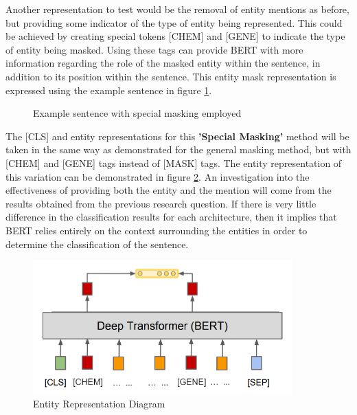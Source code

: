 \documentclass{l4proj}
\begin{document}
Another representation to test would be the removal of entity mentions as before, but providing some indicator of the type of entity being represented. This could be achieved by creating special tokens [CHEM] and [GENE] to indicate the type of entity being masked. Using these tags can provide BERT with more information regarding the role of the masked entity within the sentence, in addition to its position within the sentence. This entity mask representation is expressed using the example sentence in figure \ref{fig:Special}.

\begin{figure}[h]
    \centering
  \caption{Example sentence with special masking employed}
  \label{fig:Special}
\end{figure}

\newpage
The [CLS] and entity representations for this \textbf{'Special Masking'} method will be taken in the same way as demonstrated for the general masking method, but with [CHEM] and [GENE] tags instead of [MASK] tags. The entity representation of this variation can be demonstrated in figure \ref{fig:EMCHEM}. An investigation into the effectiveness of providing both the entity and the mention will come from the results obtained from the previous research question. If there is very little difference in the classification results for each architecture, then it implies that BERT relies entirely on the context surrounding the entities in order to determine the classification of the sentence.


\begin{figure}[htb]
    \centering
    \includegraphics[width=10cm]{images/Chem.png}
  \caption{Entity Representation Diagram}
  \label{fig:EMCHEM}
\end{figure}
\end{document}
